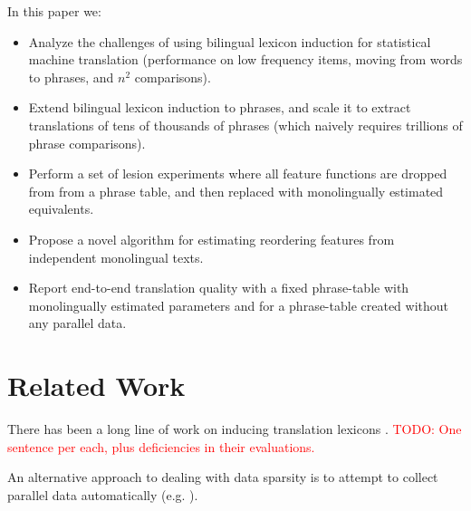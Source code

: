 \documentclass[11pt]{article}
\newcommand{\todo}[1]{\textcolor{red}{TODO: #1}}
\newcommand{\secref}[1]{Section~\ref{#1}}
\begin{document}

In this paper we:
\begin{itemize}
\item Analyze the challenges of using bilingual lexicon induction for statistical machine translation (performance on low frequency items, moving from words to phrases, and $n^2$ comparisons).
\item Extend bilingual lexicon induction to phrases, and scale it to extract translations of tens of thousands of  phrases (which naively requires trillions of phrase comparisons). 
\item Perform a set of lesion experiments where all feature functions are dropped from from a phrase table, and then replaced with monolingually estimated equivalents.
\item Propose a novel algorithm for estimating reordering features from independent monolingual texts.
\item Report end-to-end translation quality with a fixed phrase-table with monolingually estimated parameters and for a phrase-table created without any parallel data.
\end{itemize}

\section{Related Work} \label{sect:related-work}

There has been a long line of work on inducing translation lexicons \cite{Rapp:1995,Rapp:1999}.
\todo{One sentence per each, plus deficiencies in their evaluations.}

An alternative approach to dealing with data sparsity is to attempt to collect parallel data automatically (e.g. \cite{Resnik:2003,Munteanu:2006,Smith:2010,Uszkoreit:2010}).
\end{document}
